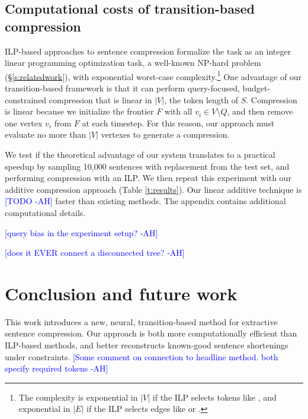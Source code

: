 \documentclass[11pt,a4paper]{article}
\newcommand{\ahcomment}[1]{\textcolor{blue}{[#1 -AH]}}
\begin{document}
\subsection{Computational costs of transition-based compression}\label{s:costs}

ILP-based approaches to sentence compression formalize the task as an integer linear programming optimization task, a well-known NP-hard problem  (\S\ref{s:relatedwork}), with exponential worst-case complexity.\footnote{The complexity is exponential in $|V|$ if the ILP selects tokens like \citet{clarke2008global}, and exponential in $|E|$ if the ILP selects edges like \citet{filippova2008dependency} or \citet{filippova2013overcoming}.} One advantage of our transition-based framework is that it can perform query-focused, budget-constrained compression that is linear in $|V|$, the token length of $S$. Compression is linear because we initialize the frontier $F$ with all $v_i \in V \setminus Q$, and then remove one vertex $v_i$ from $F$ at each timestep. For this reason, our approach must evaluate no more than $|V|$ vertexes to generate a compression. 

We test if the theoretical advantage of our system translates to a practical speedup by sampling 10,000 sentences with replacement from the test set, and performing compression with an ILP. We then repeat this experiment with our additive compression approach (Table \ref{t:results}). Our linear additive technique is \ahcomment{TODO} faster than existing methods. The appendix contains additional computational details.

\ahcomment{query bias in the experiment setup?}

\ahcomment{does it EVER connect a disconnected tree?}

\section{Conclusion and future work}

This work introduces a new, neural, transition-based method for extractive sentence compression. Our approach is both more computationally efficient than ILP-based methods, and better reconstructs known-good sentence shortenings under constraints. \ahcomment{Some comment on connection to headline method. both specify required tokens}

\end{document}
